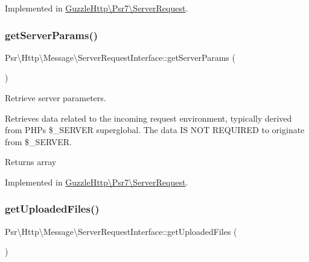 Implemented in \hyperlink{classGuzzleHttp_1_1Psr7_1_1ServerRequest_ad516a9f552dedb6d4e92cbfe81269ec0}{Guzzle\+Http\textbackslash{}\+Psr7\textbackslash{}\+Server\+Request}.

\mbox{\label{interfacePsr_1_1Http_1_1Message_1_1ServerRequestInterface_a92fa019aa4ebe9839cf931708548879f}} 
\subsubsection{\texorpdfstring{get\+Server\+Params()}{getServerParams()}}
{\footnotesize\ttfamily Psr\textbackslash{}\+Http\textbackslash{}\+Message\textbackslash{}\+Server\+Request\+Interface\+::get\+Server\+Params (\begin{DoxyParamCaption}{ }\end{DoxyParamCaption})}

Retrieve server parameters.

Retrieves data related to the incoming request environment, typically derived from P\+HP\textquotesingle{}s \$\+\_\+\+S\+E\+R\+V\+ER superglobal. The data IS N\+OT R\+E\+Q\+U\+I\+R\+ED to originate from \$\+\_\+\+S\+E\+R\+V\+ER.

\begin{DoxyReturn}{Returns}
array 
\end{DoxyReturn}


Implemented in \hyperlink{classGuzzleHttp_1_1Psr7_1_1ServerRequest_a3c3cfb1da1fa12c52fec0c5f8549c4fb}{Guzzle\+Http\textbackslash{}\+Psr7\textbackslash{}\+Server\+Request}.

\mbox{\label{interfacePsr_1_1Http_1_1Message_1_1ServerRequestInterface_ae89e3ec7f266c270ff9e7572c6d4a23f}} 
\subsubsection{\texorpdfstring{get\+Uploaded\+Files()}{getUploadedFiles()}}
{\footnotesize\ttfamily Psr\textbackslash{}\+Http\textbackslash{}\+Message\textbackslash{}\+Server\+Request\+Interface\+::get\+Uploaded\+Files (\begin{DoxyParamCaption}{ }\end{DoxyParamCaption})}

